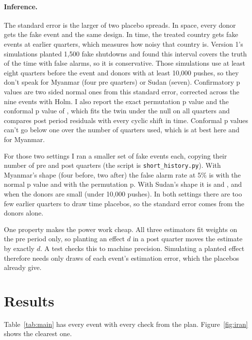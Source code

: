\documentclass[11pt]{article}
\begin{document}
\paragraph{Inference.} The standard error is the larger of two placebo spreads. In space, every donor gets the fake event and the same design. In time, the treated country gets fake events at earlier quarters, which measures how noisy that country is. Version 1's simulations planted 1,500 fake shutdowns and found this interval covers the truth \simcov{} of the time with \simsize{} false alarms, so it is conservative. Those simulations use at least eight quarters before the event and donors with at least 10,000 pushes, so they don't speak for Myanmar (four pre quarters) or Sudan (seven). Confirmatory p values are two sided normal ones from this standard error, corrected across the nine events with Holm. I also report the exact permutation p value and the conformal p value of \citet{cwz2021}, which fits the twin under the null on all quarters and compares post period residuals with every cyclic shift in time. Conformal p values can't go below one over the number of quarters used, which is \confminIRc{} at best here and \confminMM{} for Myanmar.

For those two settings I ran a smaller set of \shsims{} fake events each, copying their number of pre and post quarters (the script is \texttt{short\_history.py}). With Myanmar's shape (four before, two after) the false alarm rate at 5\% is \shnormalMM{} with the normal p value and \shpermMM{} with the permutation p. With Sudan's shape it is \shnormalSD{} and \shpermSD, and \shsmallSD{} when the donors are small (under 10,000 pushes). In both settings there are too few earlier quarters to draw time placebos, so the standard error comes from the donors alone.

One property makes the power work cheap. All three estimators fit weights on the pre period only, so planting an effect $d$ in a post quarter moves the estimate by exactly $d$. A test checks this to machine precision. Simulating a planted effect therefore needs only draws of each event's estimation error, which the placebos already give.

\section{Results}

Table~\ref{tab:main} has every event with every check from the plan. Figure~\ref{fig:iran} shows the clearest one.
\end{document}
